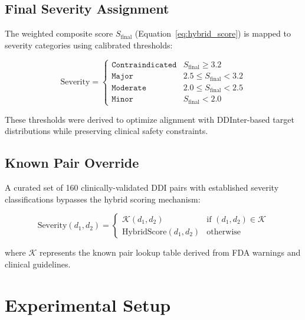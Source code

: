 \documentclass[11pt,a4paper]{article}
\begin{document}
\subsection{Final Severity Assignment}

The weighted composite score $S_{\text{final}}$ (Equation~\ref{eq:hybrid_score}) is mapped to severity categories using calibrated thresholds:

\begin{equation}
\text{Severity} = 
\begin{cases}
\texttt{Contraindicated} & S_{\text{final}} \geq 3.2 \\
\texttt{Major} & 2.5 \leq S_{\text{final}} < 3.2 \\
\texttt{Moderate} & 2.0 \leq S_{\text{final}} < 2.5 \\
\texttt{Minor} & S_{\text{final}} < 2.0
\end{cases}
\end{equation}

These thresholds were derived to optimize alignment with DDInter-based target distributions while preserving clinical safety constraints.

\subsection{Known Pair Override}

A curated set of 160 clinically-validated DDI pairs with established severity classifications bypasses the hybrid scoring mechanism:

\begin{equation}
\text{Severity}(d_1, d_2) = 
\begin{cases}
\mathcal{K}(d_1, d_2) & \text{if } (d_1, d_2) \in \mathcal{K} \\
\text{HybridScore}(d_1, d_2) & \text{otherwise}
\end{cases}
\end{equation}

where $\mathcal{K}$ represents the known pair lookup table derived from FDA warnings and clinical guidelines.

\section{Experimental Setup}
\end{document}
